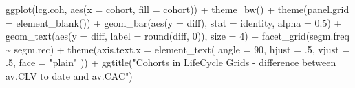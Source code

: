 \documentclass[
]{book}
\newenvironment{Shaded}{\begin{snugshade}}{\end{snugshade}}
\newcommand{\AttributeTok}[1]{\textcolor[rgb]{0.77,0.63,0.00}{#1}}
\newcommand{\DecValTok}[1]{\textcolor[rgb]{0.00,0.00,0.81}{#1}}
\newcommand{\FloatTok}[1]{\textcolor[rgb]{0.00,0.00,0.81}{#1}}
\newcommand{\FunctionTok}[1]{\textcolor[rgb]{0.00,0.00,0.00}{#1}}
\newcommand{\NormalTok}[1]{#1}
\newcommand{\SpecialCharTok}[1]{\textcolor[rgb]{0.00,0.00,0.00}{#1}}
\newcommand{\StringTok}[1]{\textcolor[rgb]{0.31,0.60,0.02}{#1}}
\begin{document}
\begin{Shaded}
\begin{Highlighting}[]
\FunctionTok{ggplot}\NormalTok{(lcg.coh, }\FunctionTok{aes}\NormalTok{(}\AttributeTok{x =}\NormalTok{ cohort, }\AttributeTok{fill =}\NormalTok{ cohort)) }\SpecialCharTok{+}
    \FunctionTok{theme\_bw}\NormalTok{() }\SpecialCharTok{+}
    \FunctionTok{theme}\NormalTok{(}\AttributeTok{panel.grid =} \FunctionTok{element\_blank}\NormalTok{()) }\SpecialCharTok{+}
    \FunctionTok{geom\_bar}\NormalTok{(}\FunctionTok{aes}\NormalTok{(}\AttributeTok{y =}\NormalTok{ diff), }\AttributeTok{stat =} \StringTok{\textquotesingle{}identity\textquotesingle{}}\NormalTok{, }\AttributeTok{alpha =} \FloatTok{0.5}\NormalTok{) }\SpecialCharTok{+}
    \FunctionTok{geom\_text}\NormalTok{(}\FunctionTok{aes}\NormalTok{(}\AttributeTok{y =}\NormalTok{ diff, }\AttributeTok{label =} \FunctionTok{round}\NormalTok{(diff, }\DecValTok{0}\NormalTok{)), }\AttributeTok{size =} \DecValTok{4}\NormalTok{) }\SpecialCharTok{+}
    \FunctionTok{facet\_grid}\NormalTok{(segm.freq }\SpecialCharTok{\textasciitilde{}}\NormalTok{ segm.rec) }\SpecialCharTok{+}
    \FunctionTok{theme}\NormalTok{(}\AttributeTok{axis.text.x =} \FunctionTok{element\_text}\NormalTok{(}
        \AttributeTok{angle =} \DecValTok{90}\NormalTok{,}
        \AttributeTok{hjust =}\NormalTok{ .}\DecValTok{5}\NormalTok{,}
        \AttributeTok{vjust =}\NormalTok{ .}\DecValTok{5}\NormalTok{,}
        \AttributeTok{face =} \StringTok{"plain"}
\NormalTok{    )) }\SpecialCharTok{+}
    \FunctionTok{ggtitle}\NormalTok{(}\StringTok{"Cohorts in LifeCycle Grids {-} difference between av.CLV to date and av.CAC"}\NormalTok{)}


\end{Highlighting}
\end{Shaded}
\end{document}
